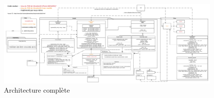 \documentclass[a4paper]{article}
\begin{document}
\begin{figure}[!ht]
    \begin{center}
        \includegraphics[width=1.5\linewidth, angle=90]{img/archi/Archi_Complete.png} 
        \caption{Architecture complète}
        \label{archiComplete}
    \end{center}
\end{figure}




\end{document}
